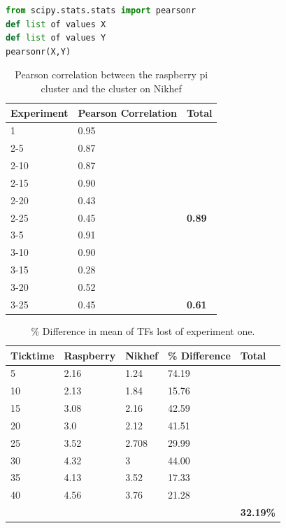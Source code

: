 \begin{lstlisting}[frame=single,language=Python,caption={Pearson correlation calculation in Python},label={lst:PearsonInPython}]
from scipy.stats.stats import pearsonr
def list of values X
def list of values Y
pearsonr(X,Y)
\end{lstlisting}

\begin{table}[h!]
\begin{tabular}{| l | l | l |}
\hline
Experiment & Pearson Correlation & Total \\ \hline
1 & 0.95 & \\ \hline
2-5 & 0.87 & \\ \hline
2-10 & 0.87 & \\ \hline
2-15 & 0.90 & \\ \hline
2-20 & 0.43 & \\ \hline
2-25 & 0.45 & \textbf{0.89} \\ \hline
3-5 & 0.91 & \\ \hline
3-10 & 0.90 & \\ \hline
3-15 & 0.28 & \\ \hline
3-20 & 0.52 & \\ \hline
3-25 & 0.45 & \textbf{0.61} \\ \hline
\end{tabular}
\caption{Pearson correlation between the raspberry pi cluster and the cluster on Nikhef}
\label{table:PearsonCor}
\end{table}

\begin{table}[h!]
\begin{tabular}{| l | l | l | l | l |}
\hline
Ticktime & Raspberry & Nikhef & \% Difference & Total \\ \hline
5 & 2.16 & 1.24 & 74.19 & \\ \hline
10 & 2.13 & 1.84 & 15.76 & \\ \hline
15 & 3.08 & 2.16 & 42.59 & \\ \hline
20 & 3.0 & 2.12 & 41.51 & \\ \hline
25 & 3.52 & 2.708 & 29.99 & \\ \hline
30 & 4.32 & 3 & 44.00 & \\ \hline
35 & 4.13 & 3.52 & 17.33 & \\ \hline
40 & 4.56 & 3.76 & 21.28 & \\ \hline
& & & & \textbf{32.19\%} \\ \hline
\end{tabular}
\caption{\% Difference in mean of TFs lost of experiment one.}
\label{table:DifEx1}
\end{table} 

